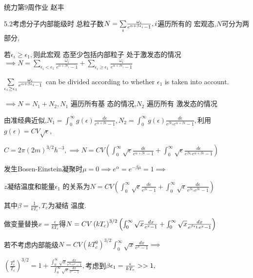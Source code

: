 \documentclass{ctexart}
\begin{document}
\bigskip \bigskip 统力第9周作业 \qquad 
赵丰

5.2考虑分子内部能级时%
总粒子数$N=\underset{i}{\sum }\frac{\omega _{i}}{%
e^{\alpha +\beta \epsilon _{i}}-1},i$遍历所有的%
宏观态,$N$可分为两部分,

若$\epsilon _{i}\geq \epsilon _{1},$则此宏观%
态至少包括内部粒子%
处于激发态的情况$\implies N=%
\underset{\epsilon _{i}<\epsilon _{1}}{\sum }\frac{\omega _{i}}{e^{\alpha
+\beta \epsilon _{i}}-1}+\underset{\epsilon _{i}\geq \epsilon _{1}}{\sum }%
\frac{\omega _{i}}{e^{\alpha +\beta \epsilon _{i}}-1}$

$\underset{\epsilon _{i}\geq \epsilon _{1}}{\sum }\frac{\omega _{i}}{%
e^{\alpha +\beta \epsilon _{i}}-1}$ can be divided according to whether $%
\epsilon _{1}$ is taken into account.

$\implies N=N_{1}+N_{2},N_{1}$ 遍历所有基%
态的情况,$N_{2}$ 遍历所有%
激发态的情况

由准经典近似,$N_{1}=\int_{0}^{\infty
}g\left( \epsilon \right) \frac{d\epsilon }{e^{\alpha +\beta \epsilon }-1}%
,N_{2}=\int_{0}^{\infty }g\left( \epsilon \right) \frac{d\epsilon }{e^{\beta
\epsilon _{1}}e^{\alpha +\beta \epsilon }-1},$利用$g\left(
\epsilon \right) =CV\sqrt{\epsilon }$,

$C=2\pi \left( 2m\right) ^{3/2}h^{-3},\implies N=CV\left( \int_{0}^{\infty }%
\sqrt{\epsilon }\frac{d\epsilon }{e^{\alpha +\beta \epsilon }-1}%
+\int_{0}^{\infty }\sqrt{\epsilon }\frac{d\epsilon }{e^{\beta \epsilon
_{1}}e^{\alpha +\beta \epsilon }-1}\right) $

发生Bosen-Einstein凝聚时$\mu =0\implies
e^{\alpha }=e^{-\beta \mu }=1\implies $

$z$凝结温度和能量$\epsilon _{1}$%
的关系为$N=CV\left( \int_{0}^{\infty }\sqrt{\epsilon 
}\frac{d\epsilon }{e^{\beta \epsilon }-1}+\int_{0}^{\infty }\sqrt{\epsilon }%
\frac{d\epsilon }{e^{\beta \epsilon _{1}}e^{\beta \epsilon }-1}\right) $

其中$\beta =\frac{1}{kT_{c}},T_{c}$为凝结%
温度.

做变量替换$x=\frac{\epsilon }{kT_{c}}$得$%
N=CV\left( kT_{c}\right) ^{3/2}\left( \int_{0}^{\infty }\sqrt{x}\frac{dx}{%
e^{x}-1}+\int_{0}^{\infty }\sqrt{x}\frac{dx}{e^{\beta \epsilon _{1}}e^{x}-1}%
\right) $

若不考虑内部能级$N=CV\left(
kT_{c}^{0}\right) ^{3/2}\int_{0}^{\infty }\sqrt{x}\frac{dx}{e^{x}-1}\implies 
$

$\left( \frac{T_{c}^{0}}{T_{c}}\right) ^{3/2}=1+\frac{\int_{0}^{\infty }%
\sqrt{x}\frac{dx}{e^{\beta \epsilon _{1}}e^{x}-1}}{\int_{0}^{\infty }\sqrt{x}%
\frac{dx}{e^{x}-1}},$考虑到$\beta \epsilon _{1}=\frac{%
\epsilon }{kT_{c}}>>1,$
\end{document}
